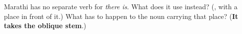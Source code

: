 \begin{tcolorbox}[breakable,colback=teal!4,colframe=teal!35!black,title={Before you move on}]
Marathi has no separate verb for \emph{there is}. What does it use instead? (\textbf{}, with a place in front of it.) What has to happen to the noun carrying that place? (\textbf{It takes the oblique stem}.)
\end{tcolorbox}
